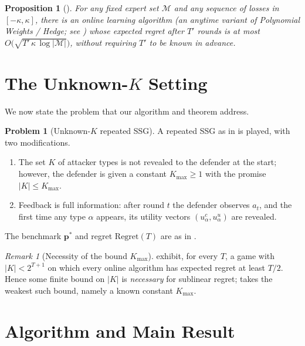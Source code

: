 \documentclass[letterpaper,9pt,twocolumn]{extarticle}
\newcommand{\pvec}{\mathbf{p}}
\newcommand{\cM}{\mathcal{M}}
\newcommand{\Kmax}{K_{\max}}
\newcommand{\Regret}{\mathrm{Regret}}
\theoremstyle{plain}
\newtheorem{proposition}[theorem]{Proposition}
\theoremstyle{definition}
\newtheorem{problem}[theorem]{Problem}
\theoremstyle{remark}
\newtheorem{remark}[theorem]{Remark}
\begin{document}
\begin{proposition}[{\citealp[Proposition 1]{balcan2015}}]
\label{prop:hedge}
For any fixed expert set $\cM$ and any sequence of losses in
$[-\kappa,\kappa]$, there is an online learning algorithm (an anytime
variant of Polynomial Weights / Hedge; see \citealp[Sec.~2]{cesa2006}) whose
expected regret after $T'$ rounds is at most
$O\bigl(\sqrt{T'\,\kappa\,\log|\cM|}\bigr)$, without requiring $T'$ to be
known in advance.
\end{proposition}

\section{The Unknown-$K$ Setting}
\label{sec:unknownK}

We now state the problem that our algorithm and theorem address.

\begin{problem}[Unknown-$K$ repeated SSG]\label{prob:unknownK}
A repeated SSG as in  is played, with two modifications.
\begin{enumerate}[leftmargin=1.2em,itemsep=0.05em,topsep=0.2em]
  \item The set $K$ of attacker types is not revealed to the defender at
  the start; however, the defender is given a constant $\Kmax\ge 1$ with
  the promise $|K|\le\Kmax$.
  \item Feedback is full information: after round $t$ the defender
  observes $a_t$, and the first time any type $\alpha$ appears, its
  utility vectors $(u_\alpha^c,u_\alpha^u)$ are revealed.
\end{enumerate}
The benchmark $\pvec^{*}$ and regret $\Regret(T)$ are as in
.
\end{problem}

\begin{remark}[Necessity of the bound $\Kmax$]\label{rem:necessity}
\citet[Theorem 7.1]{balcan2015} exhibit, for every $T$, a game with
$|K|<2^{T+1}$ on which every online algorithm has expected regret at
least $T/2$. Hence some finite bound on $|K|$ is \emph{necessary} for
sublinear regret;  takes the weakest such bound,
namely a known constant $\Kmax$.
\end{remark}



\section{Algorithm and Main Result}
\label{sec:alg}
\end{document}
